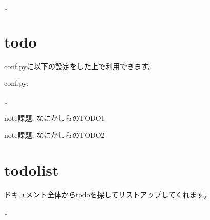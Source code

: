 \documentclass[letterpaper,10pt,dvipdfmx,openany,oneside]{sphinxmanual}
\begin{document}
↓


\section{todo}
\label{\detokenize{source/2.chapter/directive:todo}}
conf.pyに以下の設定をした上で利用できます。

conf.py:

%
\begin{sphinxVerbatim}[commandchars=\\\{\}]
  \PYG{p}{[}
\PYG{p}{]}

  
\end{sphinxVerbatim}

%
\begin{sphinxVerbatim}[commandchars=\\\{\}]
  


 

\end{sphinxVerbatim}

↓

\begin{sphinxadmonition}{note}{\label{source/2.chapter/directive:index-0}課題:}
なにかしらのTODO1
\end{sphinxadmonition}

\begin{sphinxadmonition}{note}{\label{source/2.chapter/directive:index-1}課題:}
なにかしらのTODO2
\end{sphinxadmonition}


\section{todolist}
\label{\detokenize{source/2.chapter/directive:todolist}}
ドキュメント全体からtodoを探してリストアップしてくれます。

%
\begin{sphinxVerbatim}[commandchars=\\\{\}]
 
\end{sphinxVerbatim}

↓
\end{document}
